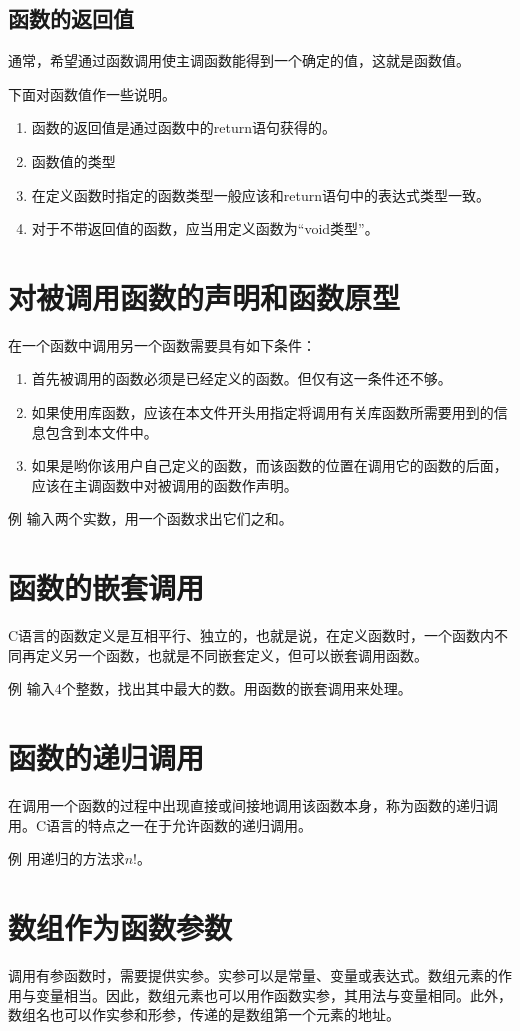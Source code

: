 \subsection{函数的返回值}
通常，希望通过函数调用使主调函数能得到一个确定的值，这就是函数值。

下面对函数值作一些说明。
\begin{enumerate}
	\item 函数的返回值是通过函数中的return语句获得的。
	\item 函数值的类型
	\item 在定义函数时指定的函数类型一般应该和return语句中的表达式类型一致。
	\item 对于不带返回值的函数，应当用定义函数为“void类型”。
\end{enumerate}
\section{对被调用函数的声明和函数原型}
在一个函数中调用另一个函数需要具有如下条件：
\begin{enumerate}
	\item 首先被调用的函数必须是已经定义的函数。但仅有这一条件还不够。
	\item 如果使用库函数，应该在本文件开头用指定将调用有关库函数所需要用到的信息包含到本文件中。
	\item 如果是哟你该用户自己定义的函数，而该函数的位置在调用它的函数的后面，应该在主调函数中对被调用的函数作声明。
\end{enumerate}

例 输入两个实数，用一个函数求出它们之和。
\section{函数的嵌套调用}
C语言的函数定义是互相平行、独立的，也就是说，在定义函数时，一个函数内不同再定义另一个函数，也就是不同嵌套定义，但可以嵌套调用函数。

例 输入4个整数，找出其中最大的数。用函数的嵌套调用来处理。
\section{函数的递归调用}
在调用一个函数的过程中出现直接或间接地调用该函数本身，称为函数的递归调用。C语言的特点之一在于允许函数的递归调用。

例 用递归的方法求$n!$。
\section{数组作为函数参数}
调用有参函数时，需要提供实参。实参可以是常量、变量或表达式。数组元素的作用与变量相当。因此，数组元素也可以用作函数实参，其用法与变量相同。此外，数组名也可以作实参和形参，传递的是数组第一个元素的地址。
